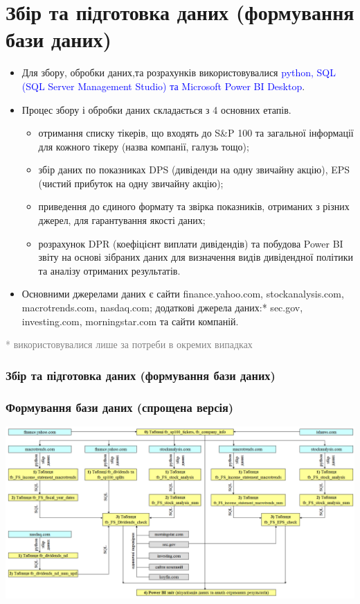 \documentclass[aspectratio=169]{beamer}
\begin{document}
\section{Збір та підготовка даних (формування бази даних)}
\begin{frame}
\begin{itemize}
\item Для збору, обробки даних,та розрахунків використовувалися \textcolor{blue} {python, SQL (SQL Server Management Studio) та Microsoft Power BI Desktop}.
\bigskip
\item \alert {Процес збору і обробки даних} складається з 4 основних етапів.
\begin{itemize}
    \item[\textcolor{orange}{\textbullet}] отримання списку тікерів, що входять до S\&P 100 та загальної інформації для кожного тікеру (назва компанії, галузь тощо);
    \item[\textcolor{orange}{\textbullet}] збір даних по показниках DPS (дивіденди на одну звичайну акцію), EPS (чистий прибуток на одну звичайну акцію);
    \item[\textcolor{orange}{\textbullet}] приведення до єдиного формату та звірка показників, отриманих з різних джерел, для гарантування якості даних;
    \item[\textcolor{orange}{\textbullet}] розрахунок DPR (коефіцієнт виплати дивідендів) та побудова Power BI звіту на основі зібраних даних для визначення видів дивідендної політики та аналізу отриманих результатів.
\end{itemize}
\bigskip
\item \alert {Основними джерелами даних} є сайти finance.yahoo.com, stockanalysis.com, macrotrends.com, nasdaq.com; додаткові джерела даних:* sec.gov, investing.com, morningstar.com та сайти компаній.
\end{itemize}
\bigskip
\scriptsize \textcolor{gray}{* використовувалися лише за потреби в окремих випадках} 
\frametitle{Збір та підготовка даних (формування бази даних)}

\end{frame}

\begin{frame}
\frametitle{Формування бази даних (спрощена версія)}
\begin{center}
\includegraphics[scale=0.35]{Data Flow full.png}
\end{center}
\end{frame}
\end{document}
